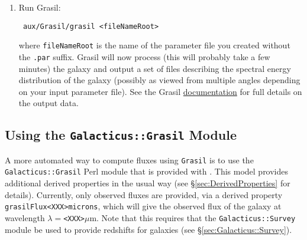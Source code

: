 \begin{enumerate}
 \item Run {\sc Grasil}:
\begin{verbatim}
 aux/Grasil/grasil <fileNameRoot>
\end{verbatim}
where {\tt fileNameRoot} is the name of the parameter file you created without the {\tt .par} suffix. {\sc Grasil} will now process (this will probably take a few minutes) the galaxy and output a set of files describing the spectral energy distribution of the galaxy (possibly as viewed from multiple angles depending on your input parameter file). See the {\sc Grasil} \href{http://adlibitum.oat.ts.astro.it/silva/grasil/grasil.doc}{documentation} for full details on the output data.
\end{enumerate}

\subsection{Using the {\tt Galacticus::Grasil} Module}

A more automated way to compute fluxes using {\tt Grasil} is to use the {\tt Galacticus::Grasil} Perl module that is provided with \glc. This model provides additional derived properties in the usual way (see \S\ref{sec:DerivedProperties} for details). Currently, only observed fluxes are provided, via a derived property {\tt grasilFlux\textless XXX\textgreater microns}, which will give the observed flux of the galaxy at wavelength $\lambda=${\tt\textless XXX\textgreater}$\mu$m. Note that this requires that the {\tt Galacticus::Survey} module be used to provide redshifts for galaxies (see \S\ref{sec:Galacticus::Survey}).


